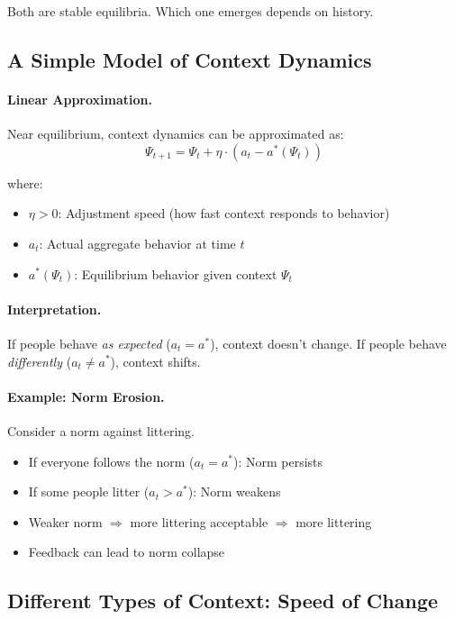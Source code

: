 \documentclass[12pt,a4paper]{article}
\begin{document}
Both are stable equilibria. Which one emerges depends on history.

\subsection{A Simple Model of Context Dynamics}

\paragraph{Linear Approximation.}
Near equilibrium, context dynamics can be approximated as:
\begin{equation}
  \Psi_{t+1} = \Psi_t + \eta \cdot (a_t - a^*(\Psi_t))
  \label{eq:contextupdate}
\end{equation}

where:
\begin{itemize}
  \item $\eta > 0$: Adjustment speed (how fast context responds to behavior)
  \item $a_t$: Actual aggregate behavior at time $t$
  \item $a^*(\Psi_t)$: Equilibrium behavior given context $\Psi_t$
\end{itemize}

\paragraph{Interpretation.}
If people behave \emph{as expected} ($a_t = a^*$), context doesn't change.
If people behave \emph{differently} ($a_t \neq a^*$), context shifts.

\paragraph{Example: Norm Erosion.}
Consider a norm against littering.
\begin{itemize}
  \item If everyone follows the norm ($a_t = a^*$): Norm persists
  \item If some people litter ($a_t > a^*$): Norm weakens
  \item Weaker norm $\Rightarrow$ more littering acceptable $\Rightarrow$ more littering
  \item Feedback can lead to norm collapse
\end{itemize}

\subsection{Different Types of Context: Speed of Change}
\end{document}
